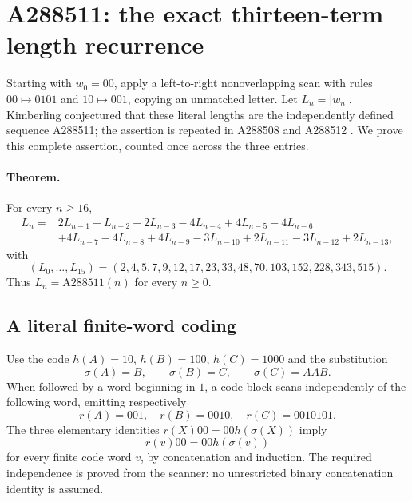\section{A288511: the exact thirteen-term length recurrence}
\label{sec:a288511}

Starting with $w_0=00$, apply a left-to-right nonoverlapping scan with
rules $00\mapsto0101$ and $10\mapsto001$, copying an unmatched letter.
Let $L_n=|w_n|$. Kimberling conjectured that these literal lengths are
the independently defined sequence A288511; the assertion is repeated
in A288508 and A288512 \cite{A288511,A288508,A288512}.
We prove this complete assertion, counted once across the three entries.

\paragraph{Theorem.}
For every $n\ge16$,
\begin{align*}
L_n={}&2L_{n-1}-L_{n-2}+2L_{n-3}-4L_{n-4}+4L_{n-5}-4L_{n-6}\\
 &+4L_{n-7}-4L_{n-8}+4L_{n-9}-3L_{n-10}+2L_{n-11}-3L_{n-12}+2L_{n-13},
\end{align*}
with
\[
(L_0,\ldots,L_{15})=(2,4,5,7,9,12,17,23,33,48,70,103,152,228,343,515).
\]
Thus $L_n=\mathrm{A288511}(n)$ for every $n\ge0$.

\subsection{A literal finite-word coding}
Use the code $h(A)=10$, $h(B)=100$, $h(C)=1000$ and the substitution
\[
\sigma(A)=B,\qquad\sigma(B)=C,\qquad\sigma(C)=AAB.
\]
When followed by a word beginning in $1$, a code block scans independently
of the following word, emitting respectively
\[
r(A)=001,\quad r(B)=0010,\quad r(C)=0010101.
\]
The three elementary identities $r(X)00=00h(\sigma(X))$ imply
\begin{equation}
r(v)00=00h(\sigma(v))
\label{eq:a288511:rotation}
\end{equation}
for every finite code word $v$, by concatenation and induction.
The required independence is proved from the scanner: no unrestricted
binary concatenation identity is assumed.

